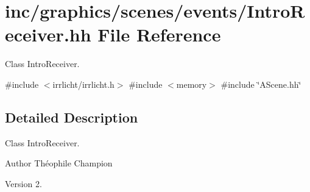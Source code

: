 \hypertarget{IntroReceiver_8hh}{}\section{inc/graphics/scenes/events/\+Intro\+Receiver.hh File Reference}
\label{IntroReceiver_8hh}


Class Intro\+Receiver.  


{\ttfamily \#include $<$irrlicht/irrlicht.\+h$>$}\newline
{\ttfamily \#include $<$memory$>$}\newline
{\ttfamily \#include \char`\"{}A\+Scene.\+hh\char`\"{}}\newline


\subsection{Detailed Description}
Class Intro\+Receiver. 

\begin{DoxyAuthor}{Author}
Théophile Champion 
\end{DoxyAuthor}
\begin{DoxyVersion}{Version}
2. 
\end{DoxyVersion}
